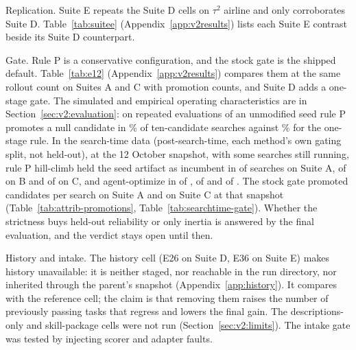 Replication. Suite E repeats the Suite D cells on $\tau^2$ airline and only corroborates Suite D. Table~\ref{tab:suitee} (Appendix~\ref{app:v2results}) lists each Suite E contrast beside its Suite D counterpart. 

Gate. Rule P is a conservative configuration, and the stock gate is the shipped default. Table~\ref{tab:e12} (Appendix~\ref{app:v2results}) compares them at the same rollout count on Suites A and C with promotion counts, and Suite D adds a one-stage gate. The simulated and empirical operating characteristics are in Section~\ref{sec:v2:evaluation}: on repeated evaluations of an unmodified seed rule P promotes a null candidate in \nullRulePTen{}\% of ten-candidate searches against \nullOneStageTen{}\% for the one-stage rule. In the search-time data (post-search-time, each method's own gating split, not held-out), at the 12 October snapshot, with some searches still running, rule P hill-climb held the seed artifact as incumbent in \stInertHcA{} of \stSearchesHcA{} searches on Suite A, \stInertHcB{} of \stSearchesHcB{} on B and \stInertHcC{} of \stSearchesHcC{} on C, and agent-optimize in \stInertAoA{} of \stSearchesAoA{}, \stInertAoB{} of \stSearchesAoB{} and \stInertAoC{} of \stSearchesAoC{}. The stock gate promoted \stPromoStockA{} candidates per search on Suite A and \stPromoStockC{} on Suite C at that snapshot (Table~\ref{tab:attrib-promotions}, Table~\ref{tab:searchtime-gate}). Whether the strictness buys held-out reliability or only inertia is answered by the final evaluation, and the verdict stays open until then. 

History and intake. The history cell (E26 on Suite D, E36 on Suite E) makes history unavailable: it is neither staged, nor reachable in the run directory, nor inherited through the parent's snapshot (Appendix~\ref{app:history}). It compares with the reference cell; the claim is that removing them raises the number of previously passing tasks that regress and lowers the final gain.  The descriptions-only and skill-package cells were not run (Section~\ref{sec:v2:limits}). The intake gate was tested by injecting scorer and adapter faults. 

